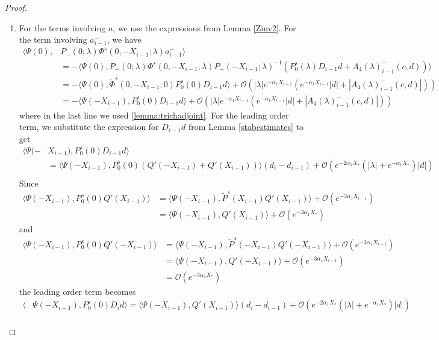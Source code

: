 \documentclass[thesis.tex]{subfiles}
\begin{document}
\begin{lemma}
\begin{proof}
\begin{enumerate}
\item For the terms involving $a$, we use the expressions from Lemma \ref{Zinv2}. For the term involving $a_{i-1}^-$, we have
\begin{align*}
\langle \Psi(0), &P_-(0; \lambda) \Phi^s(0, -X_{i-1}; \lambda) a_{i-1}^- \rangle \\
&= -\langle \Psi(0), P_-(0; \lambda) \Phi^s(0, -X_{i-1}; \lambda) P_-(-X_{i-1}; \lambda)^{-1} \left( P_0^s(\lambda) D_{i-1} d + A_4(\lambda)_{i-1}^-(c, d) \right) \rangle \\
&= -\langle \Psi(0), \tilde{\Phi}^s(0, -X_{i-1}; 0)P_0^s(0) D_{i-1} d \rangle 
+\mathcal{O}\left( |\lambda|e^{-\alpha_1 X_{i-1}}(e^{-\alpha_1 X_{i-1}}|d| + |A_4(\lambda)_{i-1}^-(c, d)|) \right) \\
&= -\langle \Psi(-X_{i-1}), P_0^s(0) D_{i-1} d \rangle +\mathcal{O}\left( |\lambda|e^{-\alpha_1 X_{i-1}}(e^{-\alpha_1 X_{i-1}}|d| + |A_4(\lambda)_{i-1}^-(c, d)|) \right)
\end{align*}
where in the last line we used \cref{lemma:trichadjoint}. For the leading order term, we substitute the expression for $D_{i-1}d$ from Lemma \ref{stabestimates} to get 
\begin{align*}
\langle \Psi(-&X_{i-1}), P_0^s(0) D_{i-1} d \rangle \\
&= \langle \Psi(-X_{i-1}), P_0^s(0)( Q'(-X_{i-1}) + Q'(X_{i-1})) \rangle (d_i - d_{i-1} ) + \mathcal{O}(e^{-2 \alpha_1 X_*}(|\lambda| + e^{-\alpha_1 X_*})|d|) \\
\end{align*}
Since
\begin{align*}
\langle \Psi(-X_{i-1}), P_0^s(0) Q'(X_{i-1})\rangle
&= \langle \Psi(-X_{i-1}), \tilde{P}^s(X_{i-1}) Q'(X_{i-1})\rangle + \mathcal{O}(e^{-3 \alpha_1 X_{i-1}}) \\
&= \langle \Psi(-X_{i-1}), Q'(X_{i-1})\rangle + \mathcal{O}(e^{-3\alpha_1 X_*})
\end{align*}
and
\begin{align*}
\langle \Psi(-X_{i-1}), P_0^s(0) Q'(-X_{i-1})\rangle
&= \langle \Psi(-X_{i-1}), \tilde{P}^s(-X_{i-1}) Q'(-X_{i-1})\rangle + \mathcal{O}(e^{-3 \alpha_1 X_{i-1}}) \\
&= \langle \Psi(-X_{i-1}), Q'(-X_{i-1})\rangle + \mathcal{O}(e^{-3 \alpha_1 X_{i-1}}) \\
&= \mathcal{O}(e^{-3 \alpha_1 X_*})
\end{align*}
the leading order term becomes
\begin{align*}
\langle &\Psi(-X_{i-1}), P_0^s(0) D_i d \rangle = \langle \Psi(-X_{i-1}), Q'(X_{i-1}) \rangle (d_i - d_{i-1} ) + \mathcal{O}(e^{-2 \alpha_1 X_*}(|\lambda| + e^{-\alpha_1 X_*})|d|) \\

\end{align*}
\end{enumerate}
\end{proof}
\end{lemma}
\end{document}
